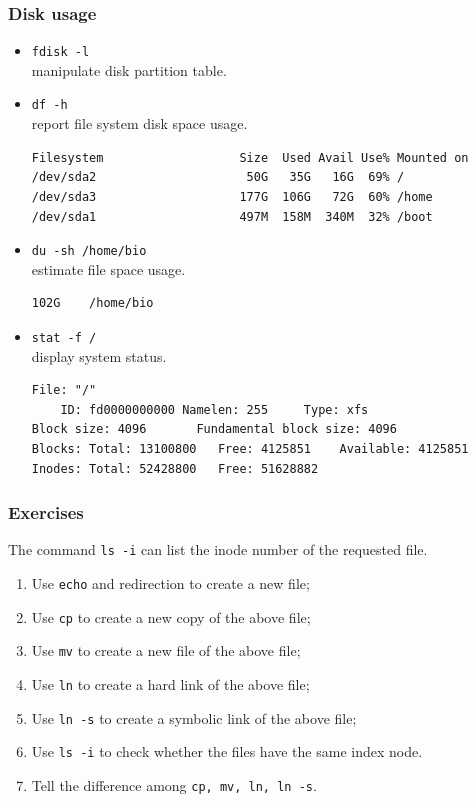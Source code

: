 \documentclass[red]{beamer}
\begin{document}
\begin{CJK*}{UTF8}{gbsn}
\begin{frame}[containsverbatim]
\frametitle{Disk usage}
\begin{itemize}
	\item \lstinline{fdisk -l}\\manipulate disk partition table.
	\item \lstinline{df -h}\\report file system disk space usage.
	\begin{lstlisting}[basicstyle=\ttfamily\tiny]
Filesystem                   Size  Used Avail Use% Mounted on
/dev/sda2                     50G   35G   16G  69% /
/dev/sda3                    177G  106G   72G  60% /home
/dev/sda1                    497M  158M  340M  32% /boot
	\end{lstlisting}
	\item \lstinline{du -sh /home/bio}\\estimate file space usage.
	\begin{lstlisting}[basicstyle=\ttfamily\tiny]
102G	/home/bio
	\end{lstlisting}
	\item \lstinline{stat -f /}\\display system status.
	\begin{lstlisting}[basicstyle=\ttfamily\tiny]
  File: "/"
    ID: fd0000000000 Namelen: 255     Type: xfs
Block size: 4096       Fundamental block size: 4096
Blocks: Total: 13100800   Free: 4125851    Available: 4125851
Inodes: Total: 52428800   Free: 51628882
	\end{lstlisting}
\end{itemize}
\end{frame}


\begin{frame}[containsverbatim]
\frametitle{Exercises}
The command \lstinline{ls -i} can list the inode number of the requested file.
\begin{enumerate}
	\item Use \lstinline{echo} and redirection to create a new file;
	\item Use \lstinline{cp} to create a new copy of the above file;
	\item Use \lstinline{mv} to create a new file of the above file;
	\item Use \lstinline{ln} to create a hard link of the above file;
	\item Use \lstinline{ln -s} to create a symbolic link of the above file;
	\item Use \lstinline{ls -i} to check whether the files have the same index node.
	\item Tell the difference among \lstinline{cp, mv, ln, ln -s}.
\end{enumerate}
\end{frame}



\end{CJK*}
\end{document}
